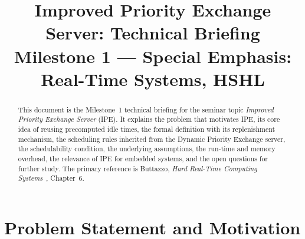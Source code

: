 \documentclass[conference]{IEEEtran}
\begin{document}
\title{Improved Priority Exchange Server: Technical Briefing\\
{\footnotesize Milestone 1 --- Special Emphasis: Real-Time Systems, HSHL}}

\author{
}

\maketitle

\begin{abstract}
This document is the Milestone~1 technical briefing for the seminar topic
\emph{Improved Priority Exchange Server} (IPE). It explains the problem that
motivates IPE, its core idea of reusing precomputed idle times, the formal
definition with its replenishment mechanism, the scheduling rules inherited
from the Dynamic Priority Exchange server, the schedulability condition, the
underlying assumptions, the run-time and memory overhead, the relevance of
IPE for embedded systems, and the open questions for further study. The
primary reference is Buttazzo, \textit{Hard Real-Time
Computing Systems}~\cite{buttazzo}, Chapter~6.
\end{abstract}

\section{Problem Statement and Motivation}
\end{document}
